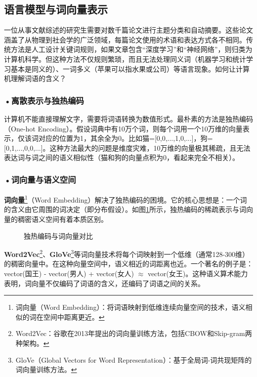 \subsection{语言模型与词向量表示}
一位从事文献综述的研究生需要对数千篇论文进行主题分类和自动摘要。这些论文涵盖了从物理到社会学的广泛领域，每篇论文使用的术语和表达方式各不相同。传统方法是人工设计关键词规则，如果文章包含“深度学习”和“神经网络”，则归类为计算机科学。但这种方法不仅规则繁琐，而且无法处理同义词（机器学习和统计学习基本是同义的）、一词多义（苹果可以指水果或公司）等语言现象。如何让计算机理解词语的含义？




\subsubsection*{\textbf{•离散表示与独热编码}}

计算机不能直接理解文字，需要将词语转换为数值形式。最朴素的方法是独热编码（One-hot Encoding）。假设词典中有10万个词，则每个词用一个10万维的向量表示，仅该词对应的位置为1，其余全为0。比如猫=[0,0,...,1,0,...]，狗=[0,1,...,0,0,...]。这种方法最大的问题是维度灾难，10万维的向量极其稀疏，且无法表达词与词之间的语义相似性（猫和狗的向量点积为0，看起来完全不相关）。

\subsubsection*{\textbf{•词向量与语义空间}}

\textbf{词向量}\footnote{词向量（Word Embedding）：将词语映射到低维连续向量空间的技术，语义相似的词在空间中距离更近。}（Word Embedding）解决了独热编码的困境。它的核心思想是：一个词的含义由它周围的词决定（即分布假设）。如图\ref{fig:ch2_2_22}所示，独热编码的稀疏表示与词向量的稠密语义空间有着本质区别。

\begin{figure}[H]
\centering
{}
\caption{独热编码与词向量对比}
\label{fig:ch2_2_22}
\end{figure}

\textbf{Word2Vec}\footnote{Word2Vec：谷歌在2013年提出的词向量训练方法，包括CBOW和Skip-gram两种架构。}、\textbf{GloVe}\footnote{GloVe（Global Vectors for Word Representation）：基于全局词-词共现矩阵的词向量训练方法。}等词向量技术将每个词映射到一个低维（通常128-300维）的稠密向量中。在这种向量空间中，语义相近的词距离也近。一个著名的例子是：vector(国王) - vector(男人) + vector(女人) $\approx$ vector(女王)。这种语义算术能力表明，词向量不仅编码了词语的含义，还编码了词语之间的关系。

